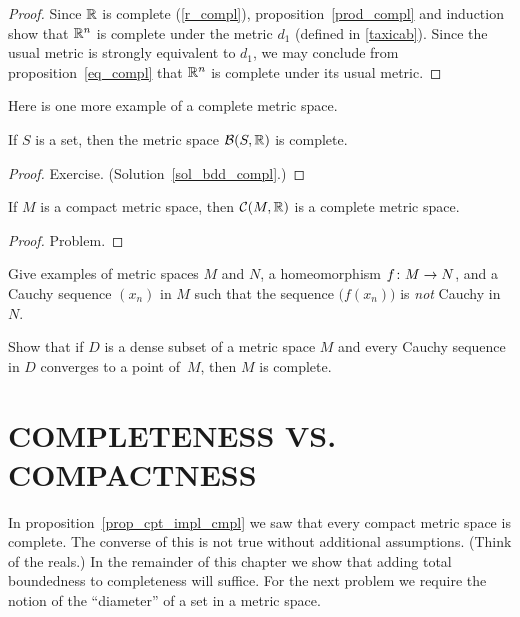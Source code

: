 \begin{proof} Since $\mathbb{R}$ is complete (\ref{r_compl}), proposition~\ref{prod_compl} and
induction show that $\mathbb{R}^n$ is complete under the metric $d_1$ (defined in \ref{taxicab}).
Since the usual metric is strongly equivalent to $d_1$, we may conclude from
proposition~\ref{eq_compl} that $\mathbb{R}^n$ is complete under its usual metric.
\end{proof}

Here is one more example of a complete metric space.

\begin{exam}\label{bdd_compl} If $S$ is a set, then the metric space $\mathcal{B}(S,\mathbb{R})$ is complete.
\end{exam}

\begin{proof} Exercise.   (Solution~\ref{sol_bdd_compl}.) \end{proof}

\begin{exam}\label{CMR_cmpl} If $M$ is a compact metric space, then $\mathcal{C}(M,\mathbb{R})$ is a
complete metric space.
\end{exam}

\begin{proof} Problem.  \ns   \end{proof}

\begin{prob} Give examples of metric spaces $M$ and $N$, a homeomorphism $f \colon M \rightarrow N$,
and a Cauchy sequence $(x_n)$ in $M$ such that the sequence $\bigl(f(x_n)\bigr)$ is \emph{not}
Cauchy in~$N$.
\end{prob}

\begin{prob} Show that if $D$ is a dense subset of a metric space $M$ and every Cauchy sequence
in $D$ converges to a point of~$M$, then $M$ is complete.
\end{prob}









\section{COMPLETENESS VS. COMPACTNESS}

In proposition~\ref{prop_cpt_impl_cmpl} we saw that every compact metric space is complete.
The converse of this is not true without additional assumptions. (Think of the reals.) In the
remainder of this chapter we show that adding total boundedness to completeness will suffice.
For the next problem we require the notion of the ``diameter'' of a set in a metric space.

